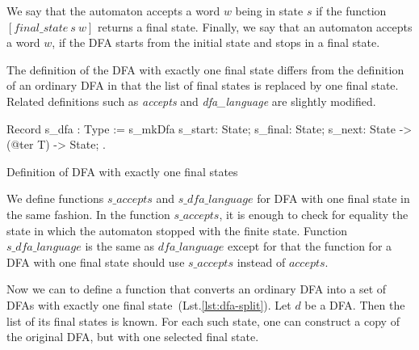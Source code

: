 We say that the automaton accepts a word $w$ being in state $s$ if the function $[\textit{final\_state} \ s \ w]$ returns a final state.
Finally, we say that an automaton accepts a word $w$, if the DFA starts from the initial state and stops in a final state.



The definition of the  DFA with exactly one final state differs from the definition of an ordinary DFA in that the list of final states is replaced by one final state. 
Related definitions such as \textit{accepts} and \textit{dfa\_language} are slightly modified.


\begin{listing}[h]
    \begin{pyglist}[language=coq, numbers=none, numbersep=5pt]
  Record s_dfa : Type :=
    s_mkDfa {
      s_start: State;
      s_final: State;
      s_next: State -> (@ter T) -> State;
  }.      
    \end{pyglist}
    \caption{Definition of DFA with exactly one final states}
    \label{lst:dfa-one-ss}
\end{listing}
  
We define functions $\textit{s\_accepts}$ and $\textit{s\_dfa\_language}$ for DFA with one final state in the same fashion.
In the function $\textit{s\_accepts}$, it is enough to check for equality the state in which the automaton stopped with the finite state. Function $\textit{s\_dfa\_language}$ is the same as  $\textit{dfa\_language}$ except for that the function for a DFA with one final state should use $\textit{s\_accepts}$ instead of $\textit{accepts}$.



Now we can to define a function that converts an ordinary DFA into a set of DFAs with exactly one final state~(Lst.\ref{lst:dfa-split}).
Let $d$ be a DFA. Then the list of its final states is known. 
For each such state, one can construct a copy of the original DFA, but with one selected final state.

